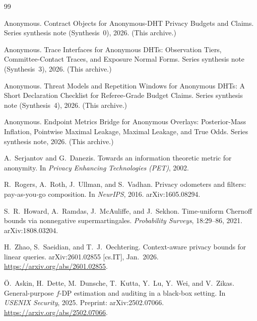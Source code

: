 \documentclass[11pt]{article}
\theoremstyle{definition}
\theoremstyle{remark}
\begin{document}
\begin{thebibliography}{99}\small

Anonymous.
\newblock Contract Objects for Anonymous-DHT Privacy Budgets and Claims.
\newblock Series synthesis note (Synthesis~0), 2026. (This archive.)


Anonymous.
\newblock Trace Interfaces for Anonymous DHTs: Observation Tiers, Committee-Contact Traces, and Exposure Normal Forms.
\newblock Series synthesis note (Synthesis~3), 2026. (This archive.)

Anonymous.
\newblock Threat Models and Repetition Windows for Anonymous DHTs: A Short Declaration Checklist for Referee-Grade Budget Claims.
\newblock Series synthesis note (Synthesis~4), 2026. (This archive.)

Anonymous.
\newblock Endpoint Metrics Bridge for Anonymous Overlays: Posterior-Mass Inflation, Pointwise Maximal Leakage, Maximal Leakage, and True Odds.
\newblock Series synthesis note, 2026. (This archive.)

A.~Serjantov and G.~Danezis.
\newblock Towards an information theoretic metric for anonymity.
\newblock In \emph{Privacy Enhancing Technologies (PET)}, 2002.

R.~Rogers, A.~Roth, J.~Ullman, and S.~Vadhan.
\newblock Privacy odometers and filters: pay-as-you-go composition.
\newblock In \emph{NeurIPS}, 2016. arXiv:1605.08294.

S.~R.~Howard, A.~Ramdas, J.~McAuliffe, and J.~Sekhon.
\newblock Time-uniform Chernoff bounds via nonnegative supermartingales.
\newblock \emph{Probability Surveys}, 18:29--86, 2021. arXiv:1808.03204.

H.~Zhao, S.~Saeidian, and T.~J.~Oechtering.
\newblock Context-aware privacy bounds for linear queries.
\newblock arXiv:2601.02855 [cs.IT], Jan.\ 2026. \url{https://arxiv.org/abs/2601.02855}.

\"{O}.~Askin, H.~Dette, M.~Dunsche, T.~Kutta, Y.~Lu, Y.~Wei, and V.~Zikas.
\newblock General-purpose $f$-DP estimation and auditing in a black-box setting.
\newblock In \emph{USENIX Security}, 2025. Preprint: arXiv:2502.07066. \url{https://arxiv.org/abs/2502.07066}.



\end{thebibliography}
\end{document}
